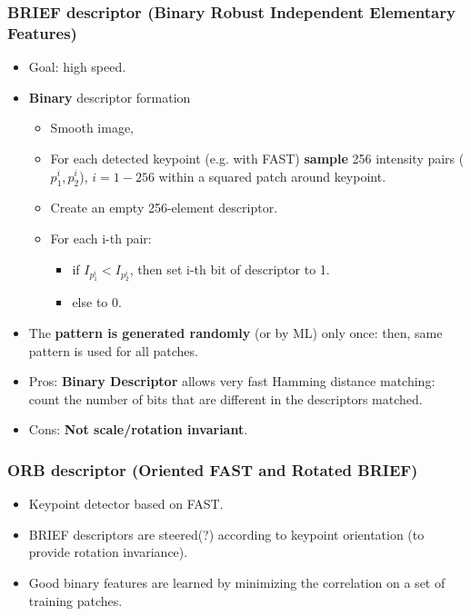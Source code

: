 \documentclass[a4paper,12 pt]{article}
\theoremstyle{definition}
\theoremstyle{remark}
\theoremstyle{definition}
\theoremstyle{definition}
\theoremstyle{definition}
\theoremstyle{remark}
\theoremstyle{definition}
\begin{document}
\subsubsection*{BRIEF descriptor (Binary Robust Independent Elementary Features)}
\begin{itemize}
\item Goal: high speed.
\item \textbf{Binary} descriptor formation
\begin{itemize}
\item Smooth image,
\item For each detected keypoint (e.g. with FAST) \textbf{sample} 256 intensity pairs ($p_1^i,p_2^i$), $i=1-256$ within a squared patch around keypoint.
\item Create an empty 256-element descriptor.
\item For each i-th pair:
\begin{itemize}
\item if $I_{p_1^i}<I_{p_2^i}$, then set i-th bit of descriptor to 1.
\item else to 0.
\end{itemize}
\end{itemize}
\item The \textbf{pattern is generated randomly} (or by ML) only once: then, same pattern is used for all patches.
\item Pros: \textbf{Binary Descriptor} allows very fast Hamming distance matching: count the number of bits that are different in the descriptors matched.
\item Cons: \textbf{Not scale/rotation invariant}.
\end{itemize}
\subsubsection*{ORB descriptor (Oriented FAST and Rotated BRIEF)}
\begin{itemize}
\item Keypoint detector based on FAST.
\item BRIEF descriptors are steered(?) according to keypoint orientation (to provide rotation invariance).
\item Good binary features are learned by minimizing the correlation on a set of training patches.
\end{itemize}
\end{document}

